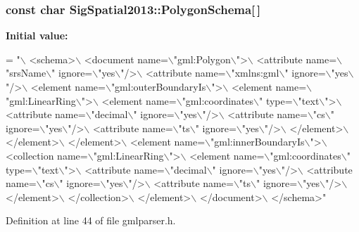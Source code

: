 \hypertarget{namespaceSigSpatial2013_ad5f605834dcd0b8d7262e7fdc75215f9}{
\subsubsection[{Polygon\-Schema}]{\setlength{\rightskip}{0pt plus 5cm}const char Sig\-Spatial2013\-::\-Polygon\-Schema\mbox{[}$\,$\mbox{]}}}\label{namespaceSigSpatial2013_ad5f605834dcd0b8d7262e7fdc75215f9}
{\bfseries Initial value\-:}
\begin{DoxyCode}
= \textcolor{stringliteral}{"\(\backslash\)}
\textcolor{stringliteral}{<schema>\(\backslash\)}
\textcolor{stringliteral}{  <document name=\(\backslash\)"gml:Polygon\(\backslash\)">\(\backslash\)}
\textcolor{stringliteral}{    <attribute name=\(\backslash\)"srsName\(\backslash\)" ignore=\(\backslash\)"yes\(\backslash\)"/>\(\backslash\)}
\textcolor{stringliteral}{    <attribute name=\(\backslash\)"xmlns:gml\(\backslash\)" ignore=\(\backslash\)"yes\(\backslash\)"/>\(\backslash\)}
\textcolor{stringliteral}{    <element name=\(\backslash\)"gml:outerBoundaryIs\(\backslash\)">\(\backslash\)}
\textcolor{stringliteral}{      <element name=\(\backslash\)"gml:LinearRing\(\backslash\)">\(\backslash\)}
\textcolor{stringliteral}{        <element name=\(\backslash\)"gml:coordinates\(\backslash\)" type=\(\backslash\)"text\(\backslash\)">\(\backslash\)}
\textcolor{stringliteral}{          <attribute name=\(\backslash\)"decimal\(\backslash\)" ignore=\(\backslash\)"yes\(\backslash\)"/>\(\backslash\)}
\textcolor{stringliteral}{          <attribute name=\(\backslash\)"cs\(\backslash\)" ignore=\(\backslash\)"yes\(\backslash\)"/>\(\backslash\)}
\textcolor{stringliteral}{          <attribute name=\(\backslash\)"ts\(\backslash\)" ignore=\(\backslash\)"yes\(\backslash\)"/>\(\backslash\)}
\textcolor{stringliteral}{        </element>\(\backslash\)}
\textcolor{stringliteral}{      </element>\(\backslash\)}
\textcolor{stringliteral}{    </element>\(\backslash\)}
\textcolor{stringliteral}{    <element name=\(\backslash\)"gml:innerBoundaryIs\(\backslash\)">\(\backslash\)}
\textcolor{stringliteral}{      <collection name=\(\backslash\)"gml:LinearRing\(\backslash\)">\(\backslash\)}
\textcolor{stringliteral}{        <element name=\(\backslash\)"gml:coordinates\(\backslash\)" type=\(\backslash\)"text\(\backslash\)">\(\backslash\)}
\textcolor{stringliteral}{          <attribute name=\(\backslash\)"decimal\(\backslash\)" ignore=\(\backslash\)"yes\(\backslash\)"/>\(\backslash\)}
\textcolor{stringliteral}{          <attribute name=\(\backslash\)"cs\(\backslash\)" ignore=\(\backslash\)"yes\(\backslash\)"/>\(\backslash\)}
\textcolor{stringliteral}{          <attribute name=\(\backslash\)"ts\(\backslash\)" ignore=\(\backslash\)"yes\(\backslash\)"/>\(\backslash\)}
\textcolor{stringliteral}{        </element>\(\backslash\)}
\textcolor{stringliteral}{      </collection>\(\backslash\)}
\textcolor{stringliteral}{    </element>\(\backslash\)}
\textcolor{stringliteral}{  </document>\(\backslash\)}
\textcolor{stringliteral}{</schema>"}
\end{DoxyCode}


Definition at line 44 of file gmlparser.\-h.

